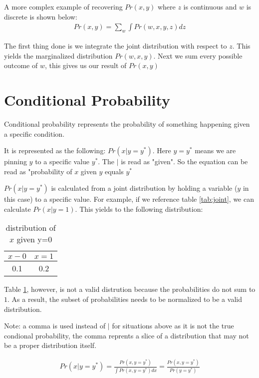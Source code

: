 \documentclass{article}
\begin{document}
A more complex example of recovering $Pr\left( x,y \right)$ where $z$ is continuous and $w$ is discrete is shown below:
\begin{align*}
	Pr\left( x,y \right) = \sum_{w} \int Pr\left( w,x,y,z \right)dz
\end{align*}

The first thing done is we integrate the joint distribution with respect to $z$. This yields the marginalized distribution $Pr\left( w,x,y \right)$. Next we sum every possible outcome of $w$, this gives us our result of $Pr\left( x,y \right) $

\section{Conditional Probability}

Conditional probability represents the probability of something happening given a specific condition.

It is represented as the following: $Pr\left( x|y=y^{*} \right) $. Here $y=y^{*}$ means we are pinning $y$ to a specific value $y^{*}$. The $|$ is read as "given". So the equation can be read as "probability of $x$ given $y$ equals $y^{*}$

$Pr\left( x|y=y^* \right) $ is calculated from a joint distribution by holding a variable ($y$ in this case) to a specific value. For example, if we reference table \ref{tab:joint}, we can calculate $Pr\left( x|y=1 \right) $. This yields to the following distribution:

\begin{table}[htpb]
	\centering
	\caption{distribution of $x$ given y=0}
	\label{tab:invalid-x-dist}
	\begin{tabular}{cc}
	$x-0$ & $x=1$\\
	\hline
	0.1 & 0.2
	\end{tabular}
\end{table}

Table \ref{tab:invalid-x-dist}, however, is not a valid distrution because the probabilities do not sum to $1$. As a result, the subset of probabilities needs to be normalized to be a valid distribution.

Note: a comma is used instead of $|$ for situations above as it is not the true condional probability, the comma reprents a slice of a distribution that may not be a proper distribution itself.

\begin{align} \label{eq:cond-prob}
	Pr\left( x|y=y^* \right) =\frac{Pr(x,y=y^*)}{\int Pr\left( x,y=y^* \right)dx } = \frac{Pr\left( x,y=y^* \right) }{Pr\left( y=y^* \right) }
\end{align}
\end{document}
